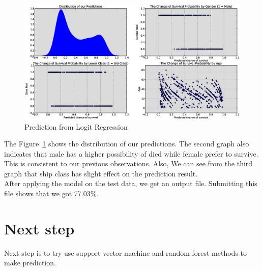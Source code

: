 \documentclass{article}
\begin{document}
\begin{figure}[h]
\begin{flushleft}
\hspace*{-1.2in}
\includegraphics[scale=0.4]{eps/prediction.eps} %
\caption{Prediction from Logit Regression}
\label {fig:pre}
\end{flushleft}
\end{figure}


The Figure~\ref{fig:pre} shows the distribution of our predictions. The second graph also indicates that male has a higher possibility of died while female prefer to survive. This is consistent to our previous observations. Also, We can see from the third graph that ship class has slight effect on the prediction result. \\

After applying the model on the test data, we get an output file. Submitting this file shows that we got 77.03\%.




\section{Next step}
Next step is to try use support vector machine and random forest methods to make prediction.
\end{document}
